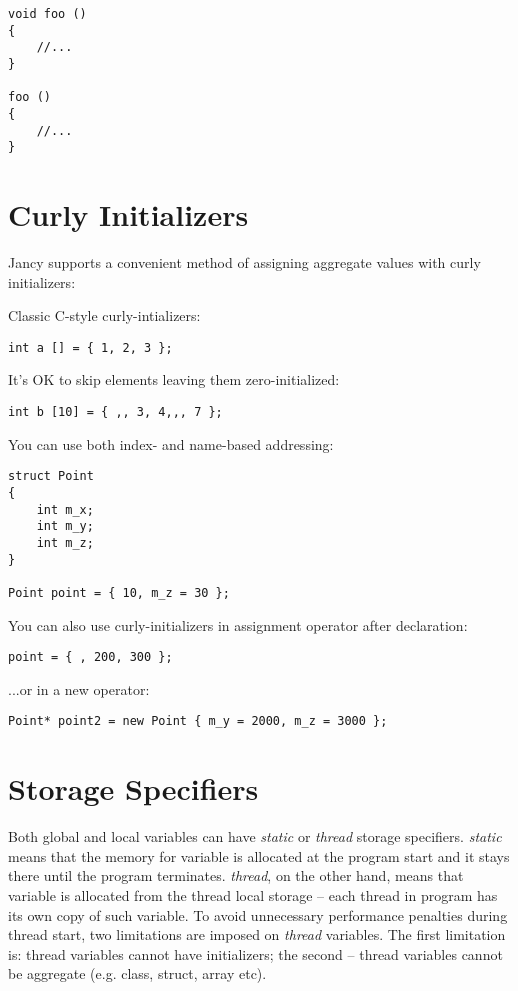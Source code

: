 \documentclass[oneside]{book}
\begin{document}
\begin{lstlisting}
void foo ()
{
	//...
}

foo ()
{
	//...
}
\end{lstlisting}

\section{Curly Initializers}
Jancy supports a convenient method of assigning aggregate values with curly initializers:

Classic C-style curly-intializers:

\begin{lstlisting}
int a [] = { 1, 2, 3 };
\end{lstlisting}

It's OK to skip elements leaving them zero-initialized:

\begin{lstlisting}
int b [10] = { ,, 3, 4,,, 7 };
\end{lstlisting}

You can use both index- and name-based addressing:

\begin{lstlisting}
struct Point
{
    int m_x;
    int m_y;
    int m_z;
}
    
Point point = { 10, m_z = 30 };
\end{lstlisting}

You can also use curly-initializers in assignment operator after declaration:

\begin{lstlisting}
point = { , 200, 300 };
\end{lstlisting}

...or in a new operator:

\begin{lstlisting}
Point* point2 = new Point { m_y = 2000, m_z = 3000 };
\end{lstlisting}

\section{Storage Specifiers}

Both global and local variables can have \emph{static} or \emph{thread} storage specifiers. \emph{static} means that the memory for variable is allocated at the program start and it stays there until the program terminates. \emph{thread}, on the other hand, means that variable is allocated from the thread local storage -- each thread in program has its own copy of such variable. To avoid unnecessary performance penalties during thread start, two limitations are imposed on \emph{thread} variables. The first limitation is: thread variables cannot have initializers; the second -- thread variables cannot be aggregate (e.g. class, struct, array etc). 
\end{document}
